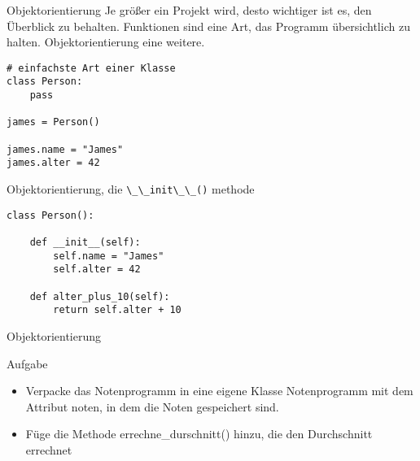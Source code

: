 \begin{frame}[fragile]{Objektorientierung}
Je größer ein Projekt wird, desto wichtiger ist es, den Überblick 
zu behalten. Funktionen sind eine Art, das Programm übersichtlich zu halten.
Objektorientierung eine weitere.
\pause{}

\begin{lstlisting}
# einfachste Art einer Klasse
class Person:
    pass

james = Person()

james.name = "James"
james.alter = 42
\end{lstlisting}
\end{frame}

\begin{frame}[fragile]{Objektorientierung, die \lstinline{\_\_init\_\_()} methode}

\begin{lstlisting}
class Person():

    def __init__(self):
        self.name = "James"
        self.alter = 42

    def alter_plus_10(self):
        return self.alter + 10

\end{lstlisting}
\end{frame}


\begin{frame}[fragile]{Objektorientierung}
\begin{block}{Aufgabe}
\begin{itemize}
    \item Verpacke das Notenprogramm in eine eigene Klasse Notenprogramm mit dem Attribut noten, in dem
    die Noten gespeichert sind.
    \item Füge die Methode errechne\_durschnitt() hinzu, die den Durchschnitt errechnet
\end{itemize}
\end{block}
\end{frame}


